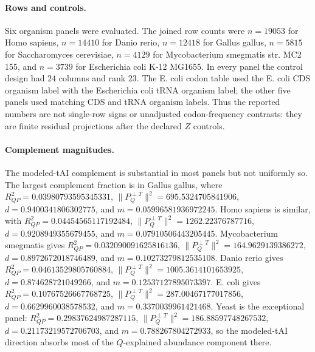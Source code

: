 \paragraph{Rows and controls.}
Six organism panels were evaluated.  The joined row counts were $n=19053$ for Homo sapiens, $n=14410$ for Danio rerio, $n=12418$ for Gallus gallus, $n=5815$ for Saccharomyces cerevisiae, $n=4129$ for Mycobacterium smegmatis str. MC2 155, and $n=3739$ for Escherichia coli K-12 MG1655.  In every panel the control design had $24$ columns and rank $23$.  The E. coli codon table used the E. coli CDS organism label with the Escherichia coli tRNA organism label; the other five panels used matching CDS and tRNA organism labels.  Thus the reported numbers are not single-row signs or unadjusted codon-frequency contrasts: they are finite residual projections after the declared $Z$ controls.

\paragraph{Complement magnitudes.}
The modeled-tAI complement is substantial in most panels but not uniformly so.  The largest complement fraction is in Gallus gallus, where $R^2_{QP}=0.03980793595345331$, $\|P_Q^{\perp T}\|^2=695.5324705841906$, $d=0.9400341806302775$, and $m=0.05996581936972245$.  Homo sapiens is similar, with $R^2_{QP}=0.04454565117192484$, $\|P_Q^{\perp T}\|^2=1262.22376787716$, $d=0.9208949355679455$, and $m=0.07910506443205445$.  Mycobacterium smegmatis gives $R^2_{QP}=0.032090091625816136$, $\|P_Q^{\perp T}\|^2=164.9629139386272$, $d=0.8972672018746489$, and $m=0.10273279812535108$.  Danio rerio gives $R^2_{QP}=0.04613529805760884$, $\|P_Q^{\perp T}\|^2=1005.3614101653925$, $d=0.874628721049266$, and $m=0.12537127895073397$.  E. coli gives $R^2_{QP}=0.10767526667768725$, $\|P_Q^{\perp T}\|^2=287.00467177017856$, $d=0.6629960038578532$, and $m=0.3370039961421468$.  Yeast is the exceptional panel: $R^2_{QP}=0.29837624987287115$, $\|P_Q^{\perp T}\|^2=186.88597748267532$, $d=0.21173219572706703$, and $m=0.788267804272933$, so the modeled-tAI direction absorbs most of the $Q$-explained abundance component there.

